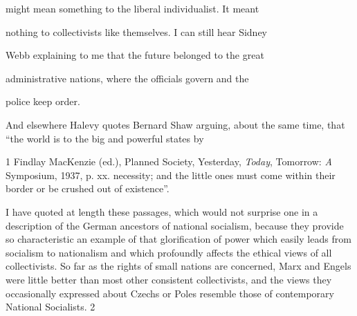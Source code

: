 \documentclass[11pt,openany]{book}
\begin{document}
might mean something to the liberal individualist. It meant

nothing to collectivists like themselves. I can still hear Sidney

Webb explaining to me that the future belonged to the great

administrative nations, where the officials govern and the

police keep order.

And elsewhere Halevy quotes Bernard Shaw arguing, about the same time, that ``the world is to the big and powerful states by

1 Findlay MacKenzie (ed.), Planned Society, Yesterday, \emph{Today}, Tomorrow: \emph{A} Symposium, 1937, p. xx. necessity; and the little ones must come within their border or be crushed out of existence''.

I have quoted at length these passages, which would not surprise one in a description of the German ancestors of national socialism, because they provide so characteristic an example of that glorification of power which easily leads from socialism to nationalism and which profoundly affects the ethical views of all collectivists. So far as the rights of small nations are concerned, Marx and Engels were little better than most other consistent collectivists, and the views they occasionally expressed about Czechs or Poles resemble those of contemporary National Socialists. 2

\begin{center}\textasteriskcentered\hspace{0.9em}\textasteriskcentered\hspace{0.9em}\textasteriskcentered\end{center}

\begin{center}\textasteriskcentered\hspace{0.9em}\textasteriskcentered\hspace{0.9em}\textasteriskcentered\end{center}

\begin{center}\textasteriskcentered\hspace{0.9em}\textasteriskcentered\hspace{0.9em}\textasteriskcentered\end{center}

\begin{center}\textasteriskcentered\hspace{0.9em}\textasteriskcentered\hspace{0.9em}\textasteriskcentered\end{center}
\end{document}
